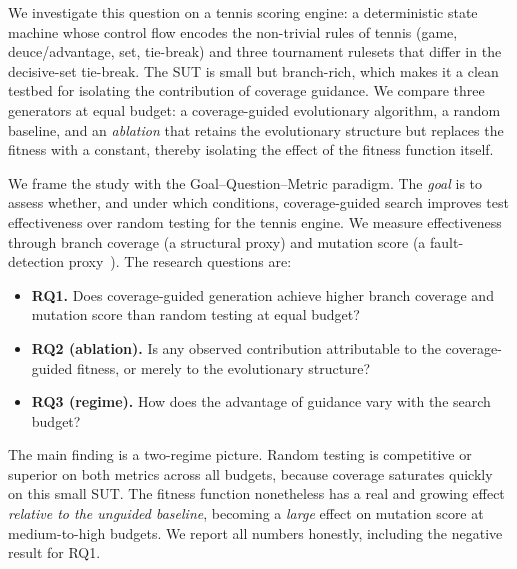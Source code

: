 \documentclass[conference]{IEEEtran}
\begin{document}
We investigate this question on a tennis scoring engine: a deterministic state
machine whose control flow encodes the non-trivial rules of tennis (game,
deuce/advantage, set, tie-break) and three tournament rulesets that differ in
the decisive-set tie-break. The SUT is small but branch-rich, which makes it a
clean testbed for isolating the contribution of coverage guidance. We compare
three generators at equal budget: a coverage-guided evolutionary algorithm, a
random baseline, and an \emph{ablation} that retains the evolutionary structure
but replaces the fitness with a constant, thereby isolating the effect of the
fitness function itself.

We frame the study with the Goal--Question--Metric paradigm. The \emph{goal} is
to assess whether, and under which conditions, coverage-guided search improves
test effectiveness over random testing for the tennis engine. We measure
effectiveness through branch coverage (a structural proxy) and mutation score
(a fault-detection proxy~\cite{just2014mutants}). The research questions are:

\begin{itemize}
\item \textbf{RQ1.} Does coverage-guided generation achieve higher branch
coverage and mutation score than random testing at equal budget?
\item \textbf{RQ2 (ablation).} Is any observed contribution attributable to the
coverage-guided fitness, or merely to the evolutionary structure?
\item \textbf{RQ3 (regime).} How does the advantage of guidance vary with the
search budget?
\end{itemize}

The main finding is a two-regime picture. Random testing is competitive or
superior on both metrics across all budgets, because coverage saturates quickly
on this small SUT. The fitness function nonetheless has a real and growing
effect \emph{relative to the unguided baseline}, becoming a \emph{large} effect
on mutation score at medium-to-high budgets. We report all numbers honestly,
including the negative result for RQ1.
\end{document}
